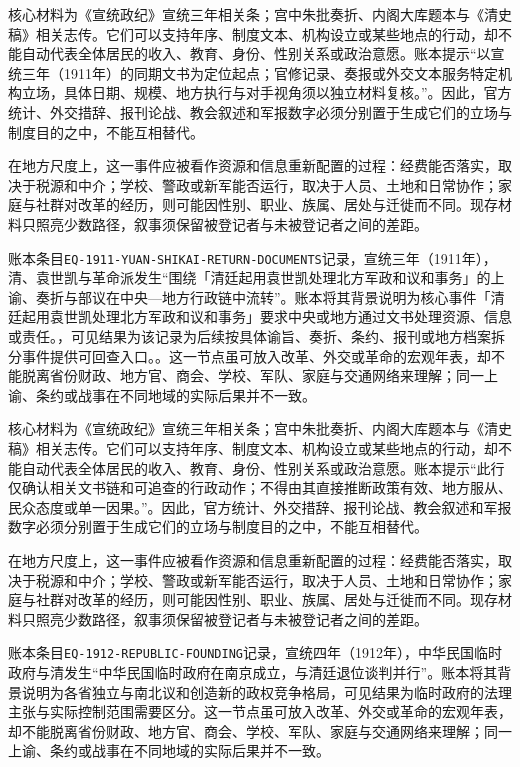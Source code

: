 核心材料为《宣统政纪》宣统三年相关条；宫中朱批奏折、内阁大库题本与《清史稿》相关志传。它们可以支持年序、制度文本、机构设立或某些地点的行动，却不能自动代表全体居民的收入、教育、身份、性别关系或政治意愿。账本提示“以宣统三年（1911年）的同期文书为定位起点；官修记录、奏报或外交文本服务特定机构立场，具体日期、规模、地方执行与对手视角须以独立材料复核。”。因此，官方统计、外交措辞、报刊论战、教会叙述和军报数字必须分别置于生成它们的立场与制度目的之中，不能互相替代。

在地方尺度上，这一事件应被看作资源和信息重新配置的过程：经费能否落实，取决于税源和中介；学校、警政或新军能否运行，取决于人员、土地和日常协作；家庭与社群对改革的经历，则可能因性别、职业、族属、居处与迁徙而不同。现存材料只照亮少数路径，叙事须保留被登记者与未被登记者之间的差距。

账本条目\texttt{EQ-1911-YUAN-SHIKAI-RETURN-DOCUMENTS}记录，宣统三年（1911年），清、袁世凯与革命派发生“围绕「清廷起用袁世凯处理北方军政和议和事务」的上谕、奏折与部议在中央—地方行政链中流转”。账本将其背景说明为核心事件「清廷起用袁世凯处理北方军政和议和事务」要求中央或地方通过文书处理资源、信息或责任。，可见结果为该记录为后续按具体谕旨、奏折、条约、报刊或地方档案拆分事件提供可回查入口。。这一节点虽可放入改革、外交或革命的宏观年表，却不能脱离省份财政、地方官、商会、学校、军队、家庭与交通网络来理解；同一上谕、条约或战事在不同地域的实际后果并不一致。

核心材料为《宣统政纪》宣统三年相关条；宫中朱批奏折、内阁大库题本与《清史稿》相关志传。它们可以支持年序、制度文本、机构设立或某些地点的行动，却不能自动代表全体居民的收入、教育、身份、性别关系或政治意愿。账本提示“此行仅确认相关文书链和可追查的行政动作；不得由其直接推断政策有效、地方服从、民众态度或单一因果。”。因此，官方统计、外交措辞、报刊论战、教会叙述和军报数字必须分别置于生成它们的立场与制度目的之中，不能互相替代。

在地方尺度上，这一事件应被看作资源和信息重新配置的过程：经费能否落实，取决于税源和中介；学校、警政或新军能否运行，取决于人员、土地和日常协作；家庭与社群对改革的经历，则可能因性别、职业、族属、居处与迁徙而不同。现存材料只照亮少数路径，叙事须保留被登记者与未被登记者之间的差距。

账本条目\texttt{EQ-1912-REPUBLIC-FOUNDING}记录，宣统四年（1912年），中华民国临时政府与清发生“中华民国临时政府在南京成立，与清廷退位谈判并行”。账本将其背景说明为各省独立与南北议和创造新的政权竞争格局，可见结果为临时政府的法理主张与实际控制范围需要区分。这一节点虽可放入改革、外交或革命的宏观年表，却不能脱离省份财政、地方官、商会、学校、军队、家庭与交通网络来理解；同一上谕、条约或战事在不同地域的实际后果并不一致。

